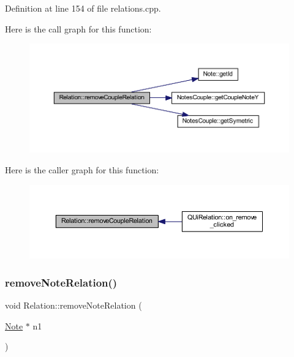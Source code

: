 Definition at line 154 of file relations.\+cpp.

Here is the call graph for this function\+:
\nopagebreak
\begin{figure}[H]
\begin{center}
\leavevmode
\includegraphics[width=350pt]{class_relation_ab81e16d688dcb4703e8ab299fef80c10_cgraph}
\end{center}
\end{figure}
Here is the caller graph for this function\+:
\nopagebreak
\begin{figure}[H]
\begin{center}
\leavevmode
\includegraphics[width=350pt]{class_relation_ab81e16d688dcb4703e8ab299fef80c10_icgraph}
\end{center}
\end{figure}
\mbox{\label{class_relation_a8f25fe0ab5bf722eb08d2dd31e99c7f4}} 
\subsubsection{\texorpdfstring{remove\+Note\+Relation()}{removeNoteRelation()}}
{\footnotesize\ttfamily void Relation\+::remove\+Note\+Relation (\begin{DoxyParamCaption}\item[{\hyperlink{class_note}{Note} $\ast$}]{n1 }\end{DoxyParamCaption})}



